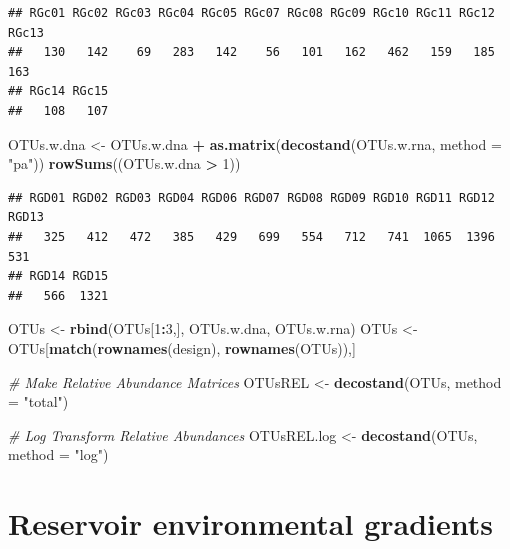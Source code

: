 \documentclass[]{article}
\newenvironment{Shaded}{\begin{snugshade}}{\end{snugshade}}
\newcommand{\CommentTok}[1]{\textcolor[rgb]{0.56,0.35,0.01}{\textit{#1}}}
\newcommand{\DataTypeTok}[1]{\textcolor[rgb]{0.13,0.29,0.53}{#1}}
\newcommand{\DecValTok}[1]{\textcolor[rgb]{0.00,0.00,0.81}{#1}}
\newcommand{\KeywordTok}[1]{\textcolor[rgb]{0.13,0.29,0.53}{\textbf{#1}}}
\newcommand{\NormalTok}[1]{#1}
\newcommand{\OperatorTok}[1]{\textcolor[rgb]{0.81,0.36,0.00}{\textbf{#1}}}
\newcommand{\StringTok}[1]{\textcolor[rgb]{0.31,0.60,0.02}{#1}}
\begin{document}
\begin{verbatim}
## RGc01 RGc02 RGc03 RGc04 RGc05 RGc07 RGc08 RGc09 RGc10 RGc11 RGc12 RGc13 
##   130   142    69   283   142    56   101   162   462   159   185   163 
## RGc14 RGc15 
##   108   107
\end{verbatim}

\begin{Shaded}
\begin{Highlighting}[]
\NormalTok{OTUs.w.dna <-}\StringTok{ }\NormalTok{OTUs.w.dna }\OperatorTok{+}\StringTok{ }\KeywordTok{as.matrix}\NormalTok{(}\KeywordTok{decostand}\NormalTok{(OTUs.w.rna, }\DataTypeTok{method =} \StringTok{"pa"}\NormalTok{))}
\KeywordTok{rowSums}\NormalTok{((OTUs.w.dna }\OperatorTok{>}\StringTok{ }\DecValTok{1}\NormalTok{))}
\end{Highlighting}
\end{Shaded}

\begin{verbatim}
## RGD01 RGD02 RGD03 RGD04 RGD06 RGD07 RGD08 RGD09 RGD10 RGD11 RGD12 RGD13 
##   325   412   472   385   429   699   554   712   741  1065  1396   531 
## RGD14 RGD15 
##   566  1321
\end{verbatim}

\begin{Shaded}
\begin{Highlighting}[]
\NormalTok{OTUs <-}\StringTok{ }\KeywordTok{rbind}\NormalTok{(OTUs[}\DecValTok{1}\OperatorTok{:}\DecValTok{3}\NormalTok{,],}
\NormalTok{              OTUs.w.dna,}
\NormalTok{              OTUs.w.rna)}
\NormalTok{OTUs <-}\StringTok{ }\NormalTok{OTUs[}\KeywordTok{match}\NormalTok{(}\KeywordTok{rownames}\NormalTok{(design), }\KeywordTok{rownames}\NormalTok{(OTUs)),]}

\CommentTok{# Make Relative Abundance Matrices}
\NormalTok{OTUsREL <-}\StringTok{ }\KeywordTok{decostand}\NormalTok{(OTUs, }\DataTypeTok{method =} \StringTok{"total"}\NormalTok{)}

\CommentTok{# Log Transform Relative Abundances}
\NormalTok{OTUsREL.log <-}\StringTok{ }\KeywordTok{decostand}\NormalTok{(OTUs, }\DataTypeTok{method =} \StringTok{"log"}\NormalTok{)}
\end{Highlighting}
\end{Shaded}

\hypertarget{reservoir-environmental-gradients}{%
\section{Reservoir environmental
gradients}\label{reservoir-environmental-gradients}}
\end{document}
